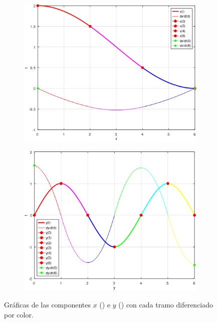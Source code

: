 \documentclass{article}
\begin{document}
    \begin{figure}[h]
        \centering
        \begin{subfigure}{0.49\textwidth}
            \includegraphics[width=1\textwidth, height=0.7\textwidth]{fig1}
            \caption{\label{fig:2a}}
        \end{subfigure}
        \begin{subfigure}{0.49\textwidth}
            \includegraphics[width=1\textwidth, height=0.7\textwidth]{fig2}
            \caption{\label{fig:2b}}
        \end{subfigure}
        \caption{Gráficas de las componentes \(x\) () e \(y\) () con cada tramo diferenciado por color.}
        \label{fig1}
    \end{figure}
\end{document}
